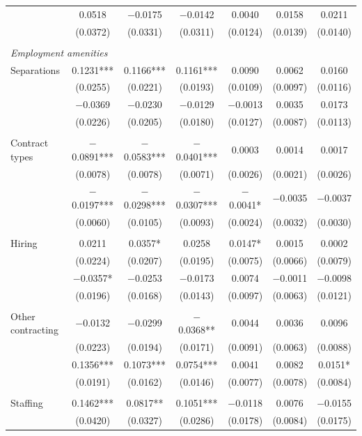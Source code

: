 \documentclass[12pt,letterpaper]{article}
\begin{document}
\begin{longtable}{l cccccc}
  & 0.0518 & $-$0.0175 & $-$0.0142 & 0.0040 & 0.0158 & 0.0211 \\
  & (0.0372) & (0.0331) & (0.0311) & (0.0124) & (0.0139) & (0.0140) \\
 & & & & & & \\
\midrule
\multicolumn{7}{l}{\textit{Employment amenities}} \\
\quad Separations & 0.1231*** & 0.1166*** & 0.1161*** & 0.0090 & 0.0062 & 0.0160 \\
  & (0.0255) & (0.0221) & (0.0193) & (0.0109) & (0.0097) & (0.0116) \\
  & $-$0.0369 & $-$0.0230 & $-$0.0129 & $-$0.0013 & 0.0035 & 0.0173 \\
  & (0.0226) & (0.0205) & (0.0180) & (0.0127) & (0.0087) & (0.0113) \\
 & & & & & & \\
\quad Contract types & $-$0.0891*** & $-$0.0583*** & $-$0.0401*** & 0.0003 & 0.0014 & 0.0017 \\
  & (0.0078) & (0.0078) & (0.0071) & (0.0026) & (0.0021) & (0.0026) \\
  & $-$0.0197*** & $-$0.0298*** & $-$0.0307*** & $-$0.0041* & $-$0.0035 & $-$0.0037 \\
  & (0.0060) & (0.0105) & (0.0093) & (0.0024) & (0.0032) & (0.0030) \\
 & & & & & & \\
\quad Hiring & 0.0211 & 0.0357* & 0.0258 & 0.0147* & 0.0015 & 0.0002 \\
  & (0.0224) & (0.0207) & (0.0195) & (0.0075) & (0.0066) & (0.0079) \\
  & $-$0.0357* & $-$0.0253 & $-$0.0173 & 0.0074 & $-$0.0011 & $-$0.0098 \\
  & (0.0196) & (0.0168) & (0.0143) & (0.0097) & (0.0063) & (0.0121) \\
 & & & & & & \\
\quad Other contracting & $-$0.0132 & $-$0.0299 & $-$0.0368** & 0.0044 & 0.0036 & 0.0096 \\
  & (0.0223) & (0.0194) & (0.0171) & (0.0091) & (0.0063) & (0.0088) \\
  & 0.1356*** & 0.1073*** & 0.0754*** & 0.0041 & 0.0082 & 0.0151* \\
  & (0.0191) & (0.0162) & (0.0146) & (0.0077) & (0.0078) & (0.0084) \\
 & & & & & & \\
\quad Staffing & 0.1462*** & 0.0817** & 0.1051*** & $-$0.0118 & 0.0076 & $-$0.0155 \\
  & (0.0420) & (0.0327) & (0.0286) & (0.0178) & (0.0084) & (0.0175) \\

\end{longtable}
\end{document}

